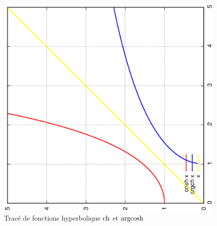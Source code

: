 %
\begin{figure}
  \centering
  \includegraphics[scale=0.4,angle=-90]{argcosh.ps}
  \caption{Tracé de fonctions hyperbolique $\operatorname{ch}$ et $\operatorname{argcosh}$}
  \label{fig:tracecoshargcosh}
\end{figure}
%
